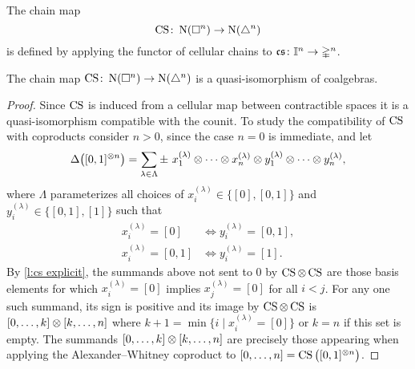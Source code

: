 %
%
%

\begin{definition}
	The chain map
	\[
	\operatorname{CS} \colon \operatorname{N}(\square^n) \to \operatorname{N}(\triangle^n)
	\]
	is defined by applying the functor of cellular chains to $\operatorname{\mathfrak{cs}} \colon \mathbb{I}^n \to \mathbb{\Delta}^n$.
\end{definition}

\begin{lemma}
	The chain map $\operatorname{CS} \colon \operatorname{N}(\square^n) \to \operatorname{N}(\triangle^n)$ is a quasi-isomorphism of coalgebras.
\end{lemma}

\begin{proof}
	Since $\operatorname{CS}$ is induced from a cellular map between contractible spaces it is a quasi-isomorphism compatible with the counit.
	To study the compatibility of $\operatorname{CS}$ with coproducts consider $n > 0$, since the case $n = 0$ is immediate, and let
	\[
	\Delta \big( [0,1]^{\otimes n} \big) = \sum_{\lambda \in \Lambda} \pm \ x_1^{(\lambda)} \otimes \cdots \otimes x_n^{(\lambda)} \otimes y_1^{(\lambda)} \otimes \cdots \otimes y_n^{(\lambda)},
	\]
	where $\Lambda$ parameterizes all choices of $x_i^{(\lambda)} \in \{[0], [0,1]\}$ and $y_i^{(\lambda)} \in \{[0,1], [1]\}$ such that
	\begin{align*}
		x_i^{(\lambda)} = [0]   & \iff y_i^{(\lambda)} = [0,1], \\
		x_i^{(\lambda)} = [0,1] & \iff y_i^{(\lambda)} = [1].
	\end{align*}
	By \cref{l:cs explicit}, the summands above not sent to $0$ by $\operatorname{CS} \otimes \operatorname{CS}$ are those basis elements for which $x_i^{(\lambda)} = [0]$ implies $x_j^{(\lambda)} = [0]$ for all $i < j$.
	For any one such summand, its sign is positive and its image by $\operatorname{CS} \otimes \operatorname{CS}$ is $[0, \dots, k] \otimes [k, \dots, n]$ where $k+1 = \min \{i \mid x_i^{(\lambda)} = [0]\}$ or $k = n$ if this set is empty.
	The summands $[0, \dots, k] \otimes [k, \dots, n]$ are precisely those appearing when applying the Alexander--Whitney coproduct to $[0, \dots, n] = \operatorname{CS} \big( [0,1]^{\otimes n} \big)$.
\end{proof}

